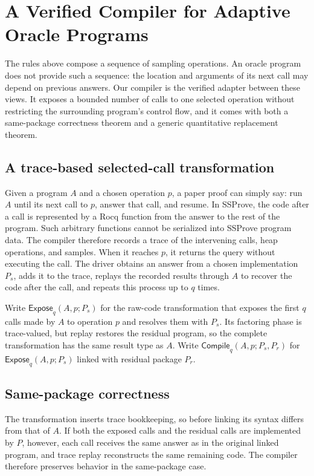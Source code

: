 \section{A Verified Compiler for Adaptive Oracle Programs}
\label{sec:trace-compiler}

The rules above compose a sequence of sampling operations.
An oracle program does not provide such a sequence: the location and arguments of its next call may depend on previous answers.
Our compiler is the verified adapter between these views.
It exposes a bounded number of calls to one selected operation without
restricting the surrounding program's control flow, and it comes with both a
same-package correctness theorem and a generic quantitative replacement theorem.

\subsection{A trace-based selected-call transformation}

Given a program \(A\) and a chosen operation \(p\), a paper proof can simply
say: run \(A\) until its next call to \(p\), answer that call, and resume.
In SSProve, the code after a call is represented by a
Rocq function from the answer to the rest of the program.  Such arbitrary
functions cannot be serialized into SSProve program data.  The compiler therefore records a
trace of the intervening calls, heap operations, and samples.
When it reaches \(p\), it returns the query without executing the call.  The
driver obtains an answer from a chosen implementation \(P_s\), adds it to the
trace, replays the recorded results through \(A\) to recover the code after the
call, and repeats this process up to \(q\) times.

Write \(\mathsf{Expose}_q(A,p;P_s)\) for the raw-code transformation that
exposes the first \(q\) calls made by \(A\) to operation \(p\) and resolves
them with \(P_s\).  Its factoring phase is trace-valued, but replay restores
the residual program, so the complete transformation has the same result type
as \(A\).  Write \(\mathsf{Compile}_q(A,p;P_s,P_r)\) for
\(\mathsf{Expose}_q(A,p;P_s)\) linked with residual package \(P_r\).

\subsection{Same-package correctness}

The transformation inserts trace bookkeeping, so before linking its syntax
differs from that of \(A\).  If both the exposed calls and the residual calls
are implemented by \(P\), however, each call receives the same answer as in
the original linked program, and trace replay reconstructs the same remaining
code.  The compiler therefore preserves behavior in the same-package case.

